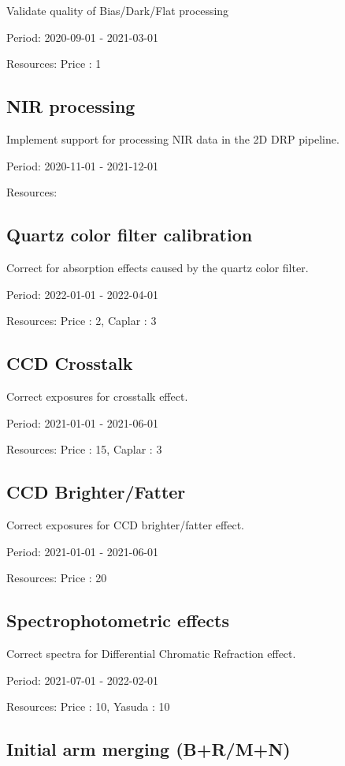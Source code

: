 Validate quality of Bias/Dark/Flat processing

Period: 2020-09-01 - 2021-03-01

Resources: Price : 1

\subsection{NIR processing}

Implement support for processing NIR data in the 2D DRP pipeline.

Period: 2020-11-01 - 2021-12-01

Resources: 

\subsection{Quartz color filter calibration}

Correct for absorption effects caused by the quartz color filter.

Period: 2022-01-01 - 2022-04-01

Resources: Price : 2, Caplar : 3

\subsection{CCD Crosstalk}

Correct exposures for crosstalk effect.

Period: 2021-01-01 - 2021-06-01

Resources: Price : 15, Caplar : 3

\subsection{CCD Brighter/Fatter}

Correct exposures for CCD brighter/fatter effect.

Period: 2021-01-01 - 2021-06-01

Resources: Price : 20

\subsection{Spectrophotometric effects}

Correct spectra for Differential Chromatic Refraction effect.

Period: 2021-07-01 - 2022-02-01

Resources: Price : 10, Yasuda : 10

\subsection{Initial arm merging (B+R/M+N)}

